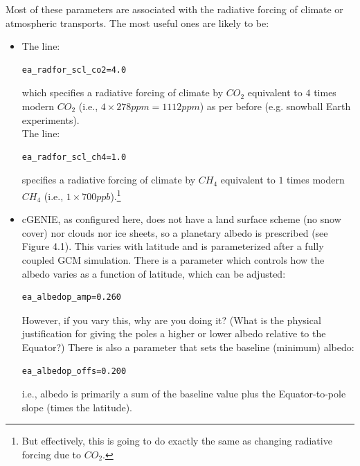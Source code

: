 \newpage 

Most of these parameters are associated with the radiative forcing of climate or atmospheric transports. The most useful ones are likely to be:

\begin{itemize}[noitemsep]

\vspace{1mm}
\item[\textbf{(i)}] The line:
\vspace{-1mm}\begin{verbatim}
ea_radfor_scl_co2=4.0
\end{verbatim}\vspace{-1mm}
which specifies a radiative forcing of climate by \(CO_{2}\) equivalent to \(4\) times modern \(CO_{2}\) (i.e., \(4\times278 ppm = 1112 ppm\)) as per before (e.g. snowball Earth experiments).
\\The line:
\vspace{-1mm}\begin{verbatim}
ea_radfor_scl_ch4=1.0
\end{verbatim}\vspace{-1mm}
specifies a radiative forcing of climate by \(CH_{4}\) equivalent to \(1\) times modern \(CH_{4}\) (i.e., \(1\times700 ppb\)).\footnote{But effectively, this is going to do exactly the same as changing radiative forcing due to \(CO_{2}\).}

\vspace{1mm}
\item[\textbf{(ii)}] cGENIE, as configured here, does not have a land surface scheme (no snow cover) nor clouds nor ice sheets, so a planetary albedo is prescribed (see Figure 4.1). This varies with latitude and is parameterized after a fully coupled GCM simulation. There is a parameter which controls how the albedo varies as a function of latitude, which can be adjusted:
\vspace{-1mm}\begin{verbatim}
ea_albedop_amp=0.260
\end{verbatim}\vspace{-1mm}
However, if you vary this, why are you doing it? (What is the physical justification for giving the poles a higher or lower albedo relative to the Equator?)
There is also a parameter that sets the baseline (minimum) albedo:
\vspace{-1mm}\begin{verbatim}
ea_albedop_offs=0.200
\end{verbatim}\vspace{-1mm}
i.e., albedo is primarily a sum of the baseline value plus the Equator-to-pole slope (times the latitude).


\end{itemize}
